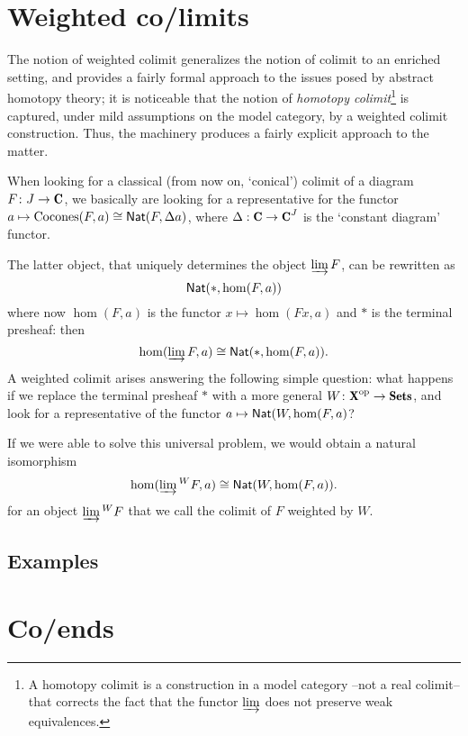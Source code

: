 \documentclass[a4paper,12pt]{amsart}
\begin{document}
\section{Weighted co/limits}
The notion of weighted colimit generalizes the notion of colimit to an enriched setting, and provides a fairly formal approach to the issues posed by abstract homotopy theory; it is noticeable that the notion of \emph{homotopy colimit}\footnote{A homotopy colimit is a construction in a model category --not a real colimit-- that corrects the fact that the functor $\varinjlim$ does not preserve weak equivalences.} is captured, under mild assumptions on the model category, by a weighted colimit construction. Thus, the machinery produces a fairly explicit approach to the matter.

When looking for a classical (from now on, `conical') colimit of a diagram $F\colon J \to \C$, we basically are looking for a representative for the functor $a\mapsto \text{Cocones}(F,a)\cong \textsf{Nat}(F,\Delta a)$, where $\Delta : \C \to \C^J$ is the `constant diagram' functor.

The latter object, that uniquely determines the object $\varinjlim F$, can be rewritten as
\[
\textsf{Nat}(*, \hom(F,a))
\]
where now $\hom(F,a)$ is the functor $x\mapsto \hom(Fx,a)$ and $*$ is the terminal presheaf: then
\[
\hom(\varinjlim F,a)\cong \textsf{Nat}(*, \hom(F,a)).
\]
A weighted colimit arises answering the following simple question: what happens if we replace the terminal presheaf $*$ with a more general $W\colon \cate{X}^\opp\to \Sets$, and look for a representative of the functor $a\mapsto \textsf{Nat}(W, \hom(F,a)$? 

If we were able to solve this universal problem, we would obtain a natural isomorphism
\[
\hom(\varinjlim{}^W F,a)\cong \textsf{Nat}(W, \hom(F,a)).
\]
for an object $\varinjlim{}^W F$ that we call the colimit of $F$ weighted by $W$.
\subsection{Examples}
\section{Co/ends}
\end{document}
